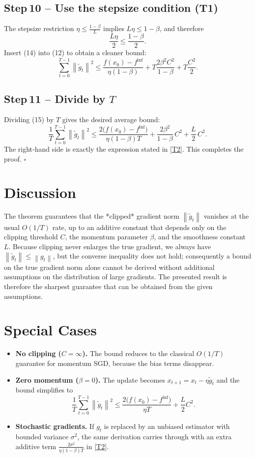\documentclass{article}
\newcommand{\norm}[1]{\left\lVert#1\right\rVert}
\begin{document}
\subsection*{Step 10 – Use the stepsize condition (T1)}
The stepsize restriction $\eta\le\frac{1-\beta}{L}$ implies $L\eta\le 1-\beta$, and therefore
\[
\frac{L\eta}{2}\le\frac{1-\beta}{2}. \tag{14}
\]
Insert (14) into (12) to obtain a cleaner bound:
\[
\sum_{t=0}^{T-1}\norm{\tilde g_t}^{2}
\le
\frac{f(x_0)-f^{\inf}}{\eta(1-\beta)}
   +T\frac{2\beta^{2}C^{2}}{1-\beta}
   +T\frac{C^{2}}{2}. \tag{15}
\]

\subsection*{Step 11 – Divide by $T$}
Dividing (15) by $T$ gives the desired average bound:
\[
\frac{1}{T}\sum_{t=0}^{T-1}\norm{\tilde g_t}^{2}
\le
\frac{2\bigl(f(x_0)-f^{\inf}\bigr)}{\eta(1-\beta)T}
   +\frac{2\beta^{2}}{1-\beta}\,C^{2}
   +\frac{L}{2}\,C^{2}. \tag{16}
\]
The right‑hand side is exactly the expression stated in \eqref{T2}. This completes the proof. \hfill $\square$

\section*{Discussion}
The theorem guarantees that the *clipped* gradient norm $\norm{\tilde g_t}$ vanishes at the usual $O(1/T)$ rate, up to an additive constant that depends only on the clipping threshold $C$, the momentum parameter $\beta$, and the smoothness constant $L$.  
Because clipping never enlarges the true gradient, we always have $\norm{\tilde g_t}\le\norm{g_t}$, but the converse inequality does not hold; consequently a bound on the true gradient norm alone cannot be derived without additional assumptions on the distribution of large gradients. The presented result is therefore the sharpest guarantee that can be obtained from the given assumptions.

\section*{Special Cases}
\begin{itemize}
    \item \textbf{No clipping ($C=\infty$).}  The bound reduces to the classical $O(1/T)$ guarantee for momentum SGD, because the bias terms disappear.
    \item \textbf{Zero momentum ($\beta=0$).}  The update becomes $x_{t+1}=x_t-\eta\tilde g_t$ and the bound simplifies to
    \[
        \frac{1}{T}\sum_{t=0}^{T-1}\norm{\tilde g_t}^{2}
        \le \frac{2\bigl(f(x_0)-f^{\inf}\bigr)}{\eta T}
           +\frac{L}{2}C^{2}.
    \]
    \item \textbf{Stochastic gradients.}  If $g_t$ is replaced by an unbiased estimator with bounded variance $\sigma^{2}$, the same derivation carries through with an extra additive term $\frac{2\sigma^{2}}{\eta(1-\beta)T}$ in \eqref{T2}.
\end{itemize}
\end{document}
